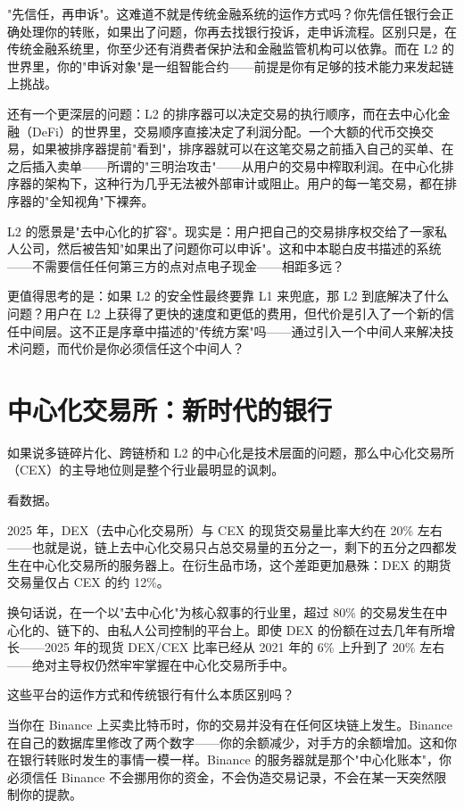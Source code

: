 \documentclass[a4paper,12pt,openany]{ctexbook}
\begin{document}
"先信任，再申诉"。这难道不就是传统金融系统的运作方式吗？你先信任银行会正确处理你的转账，如果出了问题，你再去找银行投诉，走申诉流程。区别只是，在传统金融系统里，你至少还有消费者保护法和金融监管机构可以依靠。而在 L2 的世界里，你的"申诉对象"是一组智能合约——前提是你有足够的技术能力来发起链上挑战。

还有一个更深层的问题：L2 的排序器可以决定交易的执行顺序，而在去中心化金融（DeFi）的世界里，交易顺序直接决定了利润分配。一个大额的代币交换交易，如果被排序器提前"看到"，排序器就可以在这笔交易之前插入自己的买单、在之后插入卖单——所谓的"三明治攻击"——从用户的交易中榨取利润。在中心化排序器的架构下，这种行为几乎无法被外部审计或阻止。用户的每一笔交易，都在排序器的"全知视角"下裸奔。

L2 的愿景是"去中心化的扩容"。现实是：用户把自己的交易排序权交给了一家私人公司，然后被告知"如果出了问题你可以申诉"。这和中本聪白皮书描述的系统——不需要信任任何第三方的点对点电子现金——相距多远？

更值得思考的是：如果 L2 的安全性最终要靠 L1 来兜底，那 L2 到底解决了什么问题？用户在 L2 上获得了更快的速度和更低的费用，但代价是引入了一个新的信任中间层。这不正是序章中描述的"传统方案"吗——通过引入一个中间人来解决技术问题，而代价是你必须信任这个中间人？


\section*{中心化交易所：新时代的银行}


如果说多链碎片化、跨链桥和 L2 的中心化是技术层面的问题，那么中心化交易所（CEX）的主导地位则是整个行业最明显的讽刺。

看数据。

2025 年，DEX（去中心化交易所）与 CEX 的现货交易量比率大约在 20\% 左右——也就是说，链上去中心化交易只占总交易量的五分之一，剩下的五分之四都发生在中心化交易所的服务器上。在衍生品市场，这个差距更加悬殊：DEX 的期货交易量仅占 CEX 的约 12\%。

换句话说，在一个以"去中心化"为核心叙事的行业里，超过 80\% 的交易发生在中心化的、链下的、由私人公司控制的平台上。即使 DEX 的份额在过去几年有所增长——2025 年的现货 DEX/CEX 比率已经从 2021 年的 6\% 上升到了 20\% 左右——绝对主导权仍然牢牢掌握在中心化交易所手中。

这些平台的运作方式和传统银行有什么本质区别吗？

当你在 Binance 上买卖比特币时，你的交易并没有在任何区块链上发生。Binance 在自己的数据库里修改了两个数字——你的余额减少，对手方的余额增加。这和你在银行转账时发生的事情一模一样。Binance 的服务器就是那个"中心化账本"，你必须信任 Binance 不会挪用你的资金，不会伪造交易记录，不会在某一天突然限制你的提款。
\end{document}
